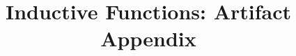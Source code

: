 \documentclass[sigplan,screen]{acmart}
\begin{document}
\title{Inductive Functions: Artifact Appendix}
\maketitle
\appendix

\end{document}
